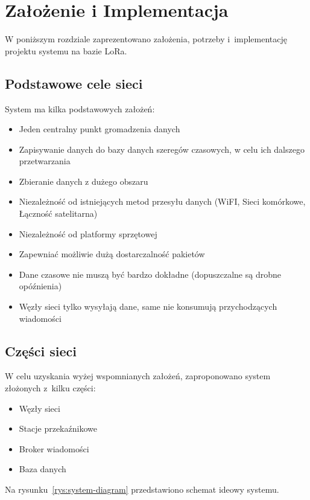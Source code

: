 \chapter{Założenie i Implementacja}
W poniższym rozdziale zaprezentowano założenia, potrzeby i~implementację projektu systemu na bazie LoRa.

\section{Podstawowe cele sieci}
System ma kilka podstawowych założeń:
\begin{itemize}
    \item Jeden centralny punkt gromadzenia danych
    \item Zapisywanie danych do bazy danych szeregów czasowych, w celu ich dalszego przetwarzania
    \item Zbieranie danych z dużego obszaru
    \item Niezależność od istniejących metod przesyłu danych (WiFI, Sieci komórkowe, Łączność satelitarna)
    \item Niezależność od platformy sprzętowej
    \item Zapewniać możliwie dużą dostarczalność pakietów
    \item Dane czasowe nie muszą być bardzo dokładne (dopuszczalne są drobne opóźnienia)
    \item Węzły sieci tylko wysyłają dane, same nie konsumują przychodzących wiadomości
\end{itemize}

\section{Części sieci}
W celu uzyskania wyżej wspomnianych założeń, zaproponowano system złożonych z~kilku części:
\begin{itemize}
    \item Węzły sieci
    \item Stacje przekaźnikowe
    \item Broker wiadomości
    \item Baza danych
\end{itemize}
Na rysunku~\ref{rys:system-diagram} przedstawiono schemat ideowy systemu.

